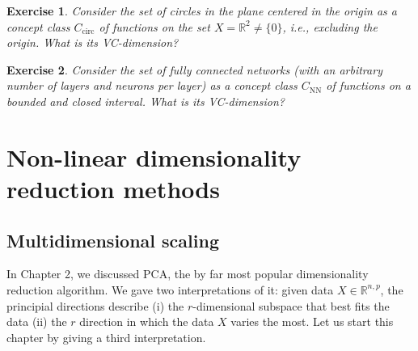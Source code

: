 \documentclass{article}
\newcommand{\R}{\mathbb{R}}
\newtheorem{exercise}{Exercise}
\begin{document}
\begin{exercise}
    Consider the set of circles in the plane centered in the origin as a concept class $C_{\mathrm{circ}}$ of functions on the set $X= \R^2 \neq \{0\}$, i.e., excluding the origin. What is its VC-dimension?
\end{exercise}

\begin{exercise}
    Consider the set of fully connected networks (with an arbitrary number of layers and neurons per layer) as a concept class $C_{\mathrm{NN}}$ of functions on a bounded and closed interval. What is its VC-dimension?
\end{exercise}

\section{Non-linear dimensionality reduction methods}
\subsection{Multidimensional scaling}
In Chapter 2, we discussed PCA, the by far most popular dimensionality reduction algorithm. We gave two interpretations of it: given data $X\in \R^{n,p}$, the principial directions describe (i) the $r$-dimensional subspace that best fits the data (ii) the $r$ direction in which the data $X$ varies the most. Let us start this chapter by giving a third interpretation. 
\end{document}
